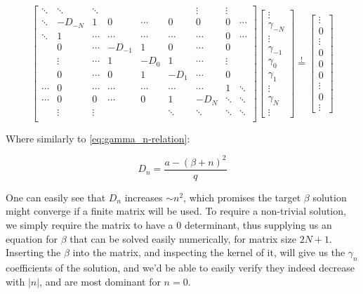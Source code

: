 \begin{equation}
\begin{bmatrix}
\ddots & \ddots & \ddots & & & & \vdots & \vdots & \\
\ddots & -D_{-N} & 1 & 0 & \cdots & 0 & 0 & 0 & \cdots \\
\ddots & 1 & \cdots & \cdots & \cdots & \cdots & \cdots & 0 & \cdots \\
& 0 & \cdots & -D_{-1} & 1 & 0 & \cdots & 0 & \\
& \vdots & \cdots & 1 & -D_0 & 1 & \cdots & \vdots & \\
& 0 & \cdots & 0 & 1 & -D_{1} & \cdots & 0 & \\
\cdots & 0 & \cdots & \cdots & \cdots & \cdots & \cdots & 1 & \ddots \\
\cdots & 0 & 0 & \cdots & 0 & 1 & -D_{N} & \ddots & \ddots \\
& \vdots & \vdots & & & \ddots & \ddots & \ddots & \ddots \\
\end{bmatrix}
\begin{bmatrix}
\vdots \\
\gamma_{-N} \\
\vdots \\
\gamma_{-1} \\
\gamma_0 \\
\gamma_{1} \\
\vdots \\
\gamma_{N} \\
\vdots
\end{bmatrix}
\overset{!}{=}
\begin{bmatrix}
\vdots \\
0 \\
\vdots \\
0 \\
0 \\
0 \\
\vdots \\
0 \\
\vdots
\end{bmatrix}
\end{equation}

Where similarly to \ref{eq:gamma_n-relation}:

$$D_n = \frac{a - \left(\beta + n\right)^2}{q}$$

One can easily see that $D_n$ increases $\sim n^2$, which promises the target $\beta$ solution might converge if a finite matrix will be used. To require a non-trivial solution, we simply require the matrix to have a $0$ determinant, thus supplying us an equation for $\beta$ that can be solved easily numerically, for matrix size $2N+1$. Inserting the $\beta$ into the matrix, and inspecting the kernel of it, will give us the $\gamma_n$ coefficients of the solution, and we'd be able to easily verify they indeed decrease with $|n|$, and are most dominant for $n=0$.


